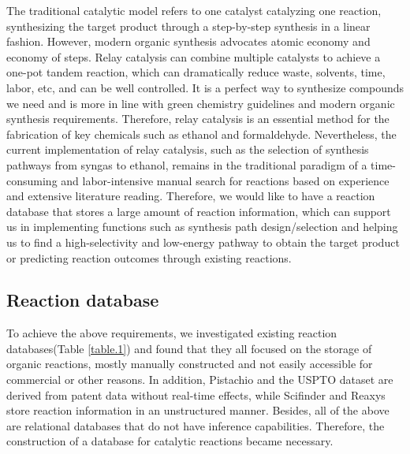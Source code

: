 \documentclass[%
 aip,
 jmp,%
 amsmath,amssymb,
 reprint,%
]{revtex4-2}
\begin{document}
The traditional catalytic model refers to one catalyst catalyzing one reaction, 
synthesizing the target product through a step-by-step synthesis in a linear fashion.
However, modern organic synthesis advocates atomic economy and economy of steps.
Relay catalysis can combine multiple catalysts to achieve a one-pot tandem reaction, 
which can dramatically reduce waste, solvents, time, labor, etc, and can be well 
controlled\cite{xiang2013asymmetric, wang2020recent}. 
It is a perfect way to synthesize compounds we need and is more in line with green 
chemistry guidelines and modern organic synthesis requirements\cite{anastas2010green}. Therefore, 
relay catalysis is an essential method for the fabrication of key chemicals
such as ethanol and formaldehyde. Nevertheless, the current implementation of 
relay catalysis, such as the selection of synthesis pathways from syngas to ethanol\cite{kang2020single}, 
remains in the traditional paradigm of a time-consuming and labor-intensive manual 
search for reactions based on experience and extensive literature reading. Therefore, 
we would like to have a reaction database that stores a large amount of reaction information, 
which can support us in implementing functions such as synthesis path design/selection 
and helping us to find a high-selectivity and low-energy pathway to obtain the target product or
predicting reaction outcomes through existing reactions.


\subsection{Reaction database}
To achieve the above requirements, we investigated existing reaction databases(Table \ref{table.1}) and found that they 
all focused on the storage of organic reactions, mostly manually constructed and not easily
accessible for commercial or other reasons. In addition, Pistachio \cite{pistachio} and the USPTO \cite{lowe2012extraction} dataset are derived from patent data without real-time effects,
while Scifinder \cite{gabrielson2018scifinder} and Reaxys \cite{Reaxys} store reaction information in an unstructured manner. Besides, all of the 
above are relational databases that do not have inference capabilities. Therefore, the construction of a database for catalytic reactions became necessary.
\end{document}
